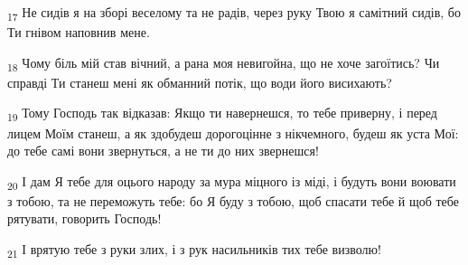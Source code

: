 \begin{tcolorbox}
\textsubscript{17} Не сидів я на зборі веселому та не радів, через руку Твою я самітний сидів, бо Ти гнівом наповнив мене.
\end{tcolorbox}
\begin{tcolorbox}
\textsubscript{18} Чому біль мій став вічний, а рана моя невигойна, що не хоче загоїтись? Чи справді Ти станеш мені як обманний потік, що води його висихають?
\end{tcolorbox}
\begin{tcolorbox}
\textsubscript{19} Тому Господь так відказав: Якщо ти навернешся, то тебе приверну, і перед лицем Моїм станеш, а як здобудеш дорогоцінне з нікчемного, будеш як уста Мої: до тебе самі вони звернуться, а не ти до них звернешся!
\end{tcolorbox}
\begin{tcolorbox}
\textsubscript{20} І дам Я тебе для оцього народу за мура міцного із міді, і будуть вони воювати з тобою, та не переможуть тебе: бо Я буду з тобою, щоб спасати тебе й щоб тебе рятувати, говорить Господь!
\end{tcolorbox}
\begin{tcolorbox}
\textsubscript{21} І врятую тебе з руки злих, і з рук насильників тих тебе визволю!
\end{tcolorbox}
